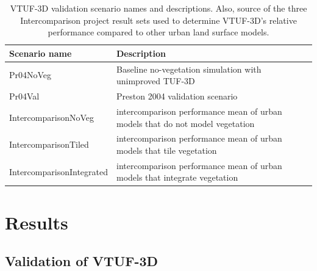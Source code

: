\documentclass[final,3p,times,authoryear]{elsarticle}
\begin{document}
\begin{center}
\begin{table}[!htbp]
\caption{VTUF-3D validation scenario names and descriptions. Also, source of the three Intercomparison project result sets used to determine VTUF-3D's relative performance compared to other urban land surface models.\label{tab:simscompared}} 
\begin{tabular}{  | p{0.30\linewidth} | p{0.70\linewidth} |  } 
\hline \textbf{Scenario name} & \textbf{Description}  \\ \hline
Pr04NoVeg & Baseline no-vegetation simulation with unimproved TUF-3D    \\ \hline
Pr04Val & Preston 2004 validation scenario  \\ \hline	
IntercomparisonNoVeg & \cite{Best2012} intercomparison performance mean of urban models that do not model vegetation  \\ \hline
IntercomparisonTiled & \cite{Best2012} intercomparison performance mean of urban models that tile vegetation  \\ \hline
IntercomparisonIntegrated & \cite{Best2012} intercomparison performance mean of urban models that integrate vegetation \\ \hline
  \end{tabular} 
\end{table}
\end{center}


\section{Results}
\subsection{Validation of VTUF-3D}
\end{document}
